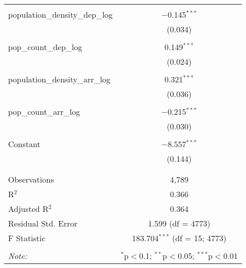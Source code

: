 \begin{table}[!htbp]
\begin{tabular}{@{\extracolsep{5pt}}lc}
  & \\ 
 population\_density\_dep\_log & $-$0.145$^{***}$ \\ 
  & (0.034) \\ 
  & \\ 
 pop\_count\_dep\_log & 0.149$^{***}$ \\ 
  & (0.024) \\ 
  & \\ 
 population\_density\_arr\_log & 0.321$^{***}$ \\ 
  & (0.036) \\ 
  & \\ 
 pop\_count\_arr\_log & $-$0.215$^{***}$ \\ 
  & (0.030) \\ 
  & \\ 
 Constant & $-$8.557$^{***}$ \\ 
  & (0.144) \\ 
  & \\ 
\hline \\[-1.8ex] 
Observations & 4,789 \\ 
R$^{2}$ & 0.366 \\ 
Adjusted R$^{2}$ & 0.364 \\ 
Residual Std. Error & 1.599 (df = 4773) \\ 
F Statistic & 183.704$^{***}$ (df = 15; 4773) \\ 
\hline 
\hline \\[-1.8ex] 
\textit{Note:}  & \multicolumn{1}{r}{$^{*}$p$<$0.1; $^{**}$p$<$0.05; $^{***}$p$<$0.01} \\ 
\end{tabular} 
\end{table} 
